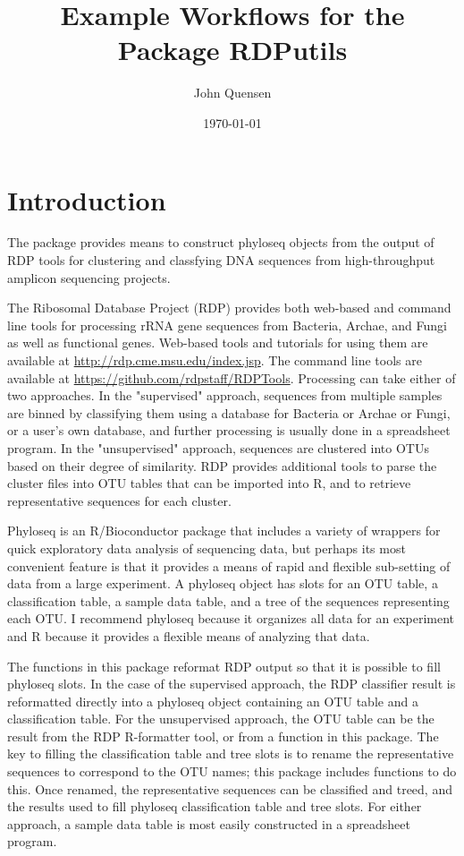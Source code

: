 \documentclass{article}
\title{Example Workflows for the Package RDPutils}
\author{John Quensen}
\date{\today}
\begin{document}


\maketitle

\section*{Introduction}
The package provides means to construct phyloseq objects from the output of RDP tools for clustering and classfying DNA sequences from high-throughput amplicon sequencing projects.

The Ribosomal Database Project (RDP) provides both web-based and command line tools for processing rRNA gene sequences from Bacteria, Archae, and Fungi as well as functional genes.  Web-based tools and tutorials for using them are available at \href{http://rdp.cme.msu.edu/index.jsp}{http://rdp.cme.msu.edu/index.jsp}.  The command line tools are available at \href{https://github.com/rdpstaff/RDPTools}{https://github.com/rdpstaff/RDPTools}. Processing can take either of two approaches.  In the "supervised" approach, sequences from multiple samples are binned by classifying them using a database for Bacteria or Archae or Fungi, or a user's own database, and further processing is usually done in a spreadsheet program.  In the "unsupervised" approach, sequences are clustered into OTUs based on their degree of similarity.   RDP provides additional tools to parse the cluster files into OTU tables that can be imported into R, and to retrieve representative sequences for each cluster.  

Phyloseq is an R/Bioconductor package that includes a variety of wrappers for quick exploratory data analysis of sequencing data, but perhaps its most convenient feature is that it provides a means of rapid and flexible sub-setting of data from a large experiment.  A phyloseq object has slots for an OTU table, a classification table, a sample data table, and a tree of the sequences representing each OTU.  I recommend phyloseq because it organizes all data for an experiment and R because it provides a flexible means of analyzing that data.

The functions in this package reformat RDP output so that it is possible to fill phyloseq slots.  In the case of the supervised approach, the RDP classifier result is reformatted directly into a phyloseq object containing an OTU table and a classification table.  For the unsupervised approach, the OTU table can be the result from the RDP R-formatter tool, or from a function in this package. The key to filling the classification table and tree slots is to rename the representative sequences to correspond to the OTU names; this package includes functions to do this.  Once renamed, the representative sequences can be classified and treed, and the results used to fill phyloseq classification table and tree slots.  For either approach, a sample data table is most easily constructed in a spreadsheet program.
\end{document}

